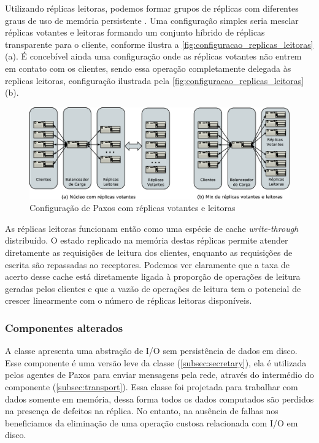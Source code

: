 Utilizando réplicas leitoras, podemos formar grupos de réplicas com diferentes graus de
uso de memória persistente \cite{aguilera00}. Uma configuração simples seria mesclar
réplicas votantes e leitoras formando um conjunto híbrido de réplicas transparente para o
cliente, conforme ilustra a \autoref{fig:configuracao_replicas_leitoras} (a). É concebível
ainda uma configuração onde as réplicas votantes não entrem em contato com os clientes,
sendo essa operação completamente delegada às replicas leitoras, configuração ilustrada
pela \autoref{fig:configuracao_replicas_leitoras} (b).

\begin{figure}[ht]
  \begin{center}
    \includegraphics[width=16cm]{conteudo/capitulos/figuras/configuracao_replicas_leitoras.eps}
  \end{center}
  \caption{Configuração de Paxos com réplicas votantes e leitoras}
  \label{fig:configuracao_replicas_leitoras}
\end{figure}

As réplicas leitoras funcionam então como uma espécie de cache \emph{write-through}
distribuído. O estado replicado na memória destas réplicas permite atender diretamente as
requisições de leitura dos clientes, enquanto as requisições de escrita são repassadas ao
receptores. Podemos ver claramente que a taxa de acerto desse cache está diretamente
ligada à proporção de operações de leitura geradas pelos clientes e que a vazão de
operações de leitura tem o potencial de crescer linearmente com o número de réplicas
leitoras disponíveis.

\subsubsection{Componentes alterados}


A classe  apresenta uma abstração de I/O sem persistência de
dados em disco. Esse componente é uma versão leve da classe 
(\autoref{subsec:secretary}), ela é utilizada pelos agentes de Paxos para enviar mensagens
pela rede, através do intermédio do componente 
(\autoref{subsec:transport}). Essa classe foi projetada para trabalhar com dados somente
em memória, dessa forma todos os dados computados são perdidos na presença de defeitos na
réplica. No entanto, na ausência de falhas nos beneficiamos da eliminação de uma operação
custosa relacionada com I/O em disco.

